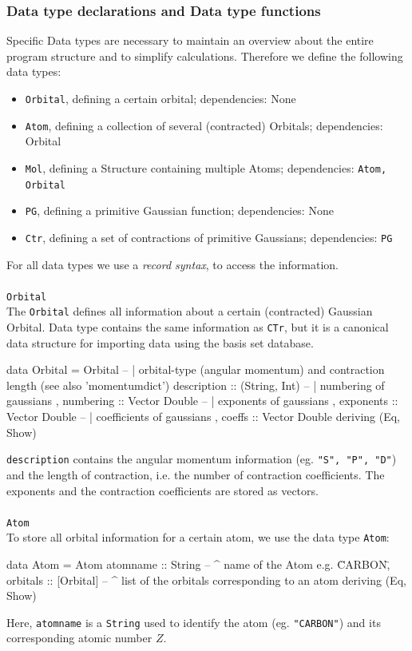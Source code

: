 \documentclass[twoside,        %
			   11pt,			%
               BCOR10mm,       %
               ngerman,english  %
               ]{scrartcl}
\begin{document}
\subsubsection{Data type declarations and Data type functions}
Specific Data types are necessary to maintain an overview about the entire program structure and to simplify calculations. Therefore we define the following data types:
\begin{itemize}
\item \texttt{Orbital}, defining a certain orbital; dependencies: None
\item \texttt{Atom}, defining a collection of several (contracted) Orbitals; dependencies: Orbital
\item \texttt{Mol}, defining a Structure containing multiple Atoms; dependencies: \texttt{Atom, Orbital}
\item \texttt{PG}, defining a primitive Gaussian function; dependencies: None
\item \texttt{Ctr}, defining a set of contractions of primitive Gaussians; dependencies: \texttt{PG}
\end{itemize}
For all data types we use a \emph{record syntax}, to access the information. \\ \\

\large{\texttt{Orbital}}\\
The \texttt{Orbital} defines all information about a certain (contracted) Gaussian Orbital. Data type contains the same information as \texttt{CTr}, but it is a canonical data structure for importing data using the basis set database. 
\begin{code}
data Orbital = Orbital { 
			-- | orbital-type (angular momentum) and contraction length  (see also 'momentumdict') 
			description :: (String, Int)
			-- | numbering of gaussians
			, numbering :: Vector Double
			-- | exponents of gaussians  
		 	, exponents :: Vector Double
			-- | coefficients of gaussians  
			, coeffs :: Vector Double  
			} deriving (Eq, Show)
\end{code} \texttt{description} contains the angular momentum information (eg. \texttt{"S", "P", "D"}) and the length of contraction, i.e. the number of contraction coefficients. The exponents and the contraction coefficients are stored as vectors. \\ \\

\large{\texttt{Atom}}\\
To store all orbital information for a certain atom, we use the data type \texttt{Atom}:
\begin{code}
data Atom = Atom {atomname :: String	-- ^ name of the Atom e.g. \"CARBON\"  
		, orbitals :: [Orbital] -- ^ list of the orbitals corresponding to an atom   
		 } deriving (Eq, Show)
\end{code}Here, \texttt{atomname} is a \texttt{String} used to identify the atom (eg. \texttt{"CARBON"}) and its corresponding atomic number $Z$. \\ \\
\end{document}
